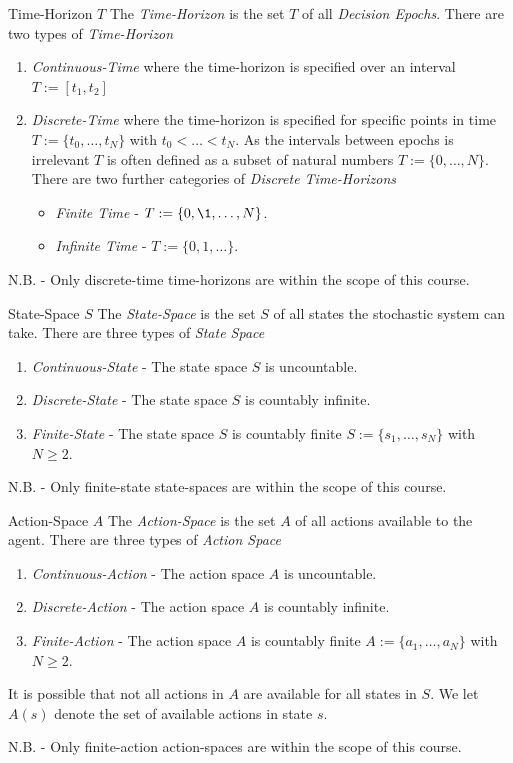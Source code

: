 \documentclass[11pt,a4paper]{article}
\begin{document}
  \begin{definition}{Time-Horizon $T$}
    The \textit{Time-Horizon} is the set $T$ of all \textit{Decision Epochs}. There are two types of \textit{Time-Horizon}
    \begin{enumerate}
      \item \textit{Continuous-Time} where the time-horizon is specified over an interval $T:=[t_1,t_2]$
      \item \textit{Discrete-Time} where the time-horizon is specified for specific points in time $T:=\{t_0,\dots,t_N\}$ with $t_0<\dots<t_N$. As the intervals between epochs is irrelevant $T$ is often defined as a subset of natural numbers $T:=\{0,\dots,N\}$. There are two further categories of \textit{Discrete Time-Horizons}
      \begin{itemize}
        \item \textit{Finite Time} - $T:=\{0,\1,\dots,N\}$.
        \item \textit{Infinite Time} - $T:=\{0,1,\dots\}$.
      \end{itemize}
    \end{enumerate}
    N.B. - Only discrete-time time-horizons are within the scope of this course.
  \end{definition}

  \begin{definition}{State-Space $S$}
    The \textit{State-Space} is the set $S$ of all states the stochastic system can take. There are three types of \textit{State Space}
    \begin{enumerate}
      \item \textit{Continuous-State} - The state space $S$ is uncountable.
      \item \textit{Discrete-State} - The state space $S$ is countably infinite.
      \item \textit{Finite-State} - The state space $S$ is countably finite $S:=\{s_1,\dots,s_N\}$ with $N\geq2$.
    \end{enumerate}
    N.B. - Only finite-state state-spaces are within the scope of this course.
  \end{definition}

  \begin{definition}{Action-Space $A$}
    The \textit{Action-Space} is the set $A$ of all actions available to the agent. There are three types of \textit{Action Space}
    \begin{enumerate}
      \item \textit{Continuous-Action} - The action space $A$ is uncountable.
      \item \textit{Discrete-Action} - The action space $A$ is countably infinite.
      \item \textit{Finite-Action} - The action space $A$ is countably finite $A:=\{a_1,\dots,a_N\}$ with $N\geq2$.
    \end{enumerate}
    \par It is possible that not all actions in $A$ are available for all states in $S$. We let $A(s)$ denote the set of available actions in state $s$.
    \par N.B. - Only finite-action action-spaces are within the scope of this course.
  \end{definition}
\end{document}
